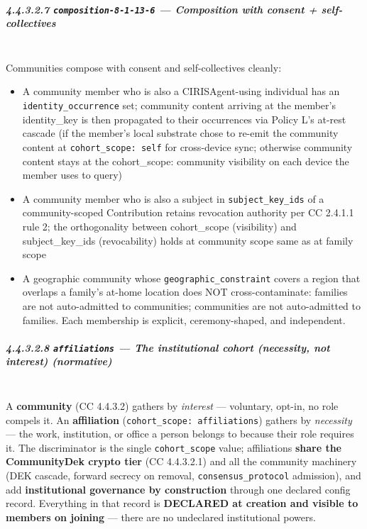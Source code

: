 \documentclass[11pt]{article}
\begin{document}
\subparagraph{4.4.3.2.7 \texttt{composition-8-1-13-6} — Composition with consent + self-collectives}\mbox{}\\


Communities compose with consent and self-collectives cleanly:


\begin{itemize}\setlength\itemsep{0pt}
\item A community member who is also a CIRISAgent-using individual has an \texttt{identity\_occurrence} set; community content arriving at the member's identity\_key is then propagated to their occurrences via Policy L's at-rest cascade (if the member's local substrate chose to re-emit the community content at \texttt{cohort\_scope: self} for cross-device sync; otherwise community content stays at the cohort\_scope: community visibility on each device the member uses to query)
\item A community member who is also a subject in \texttt{subject\_key\_ids} of a community-scoped Contribution retains revocation authority per CC 2.4.1.1 rule 2; the orthogonality between cohort\_scope (visibility) and subject\_key\_ids (revocability) holds at community scope same as at family scope
\item A geographic community whose \texttt{geographic\_constraint} covers a region that overlaps a family's at-home location does NOT cross-contaminate: families are not auto-admitted to communities; communities are not auto-admitted to families. Each membership is explicit, ceremony-shaped, and independent.
\end{itemize}


\subparagraph{4.4.3.2.8 \texttt{affiliations} — The institutional cohort (necessity, not interest) (normative)}\mbox{}\\


A \textbf{community} (CC 4.4.3.2) gathers by \textit{interest} — voluntary, opt-in, no role compels it. An \textbf{affiliation} (\texttt{cohort\_scope: affiliations}) gathers by \textit{necessity} — the work, institution, or office a person belongs to because their role requires it. The discriminator is the single \texttt{cohort\_scope} value; affiliations \textbf{share the CommunityDek crypto tier} (CC 4.4.3.2.1) and all the community machinery (DEK cascade, forward secrecy on removal, \texttt{consensus\_protocol} admission), and add \textbf{institutional governance by construction} through one declared config record. Everything in that record is \textbf{DECLARED at creation and visible to members on joining} — there are no undeclared institutional powers.
\end{document}
